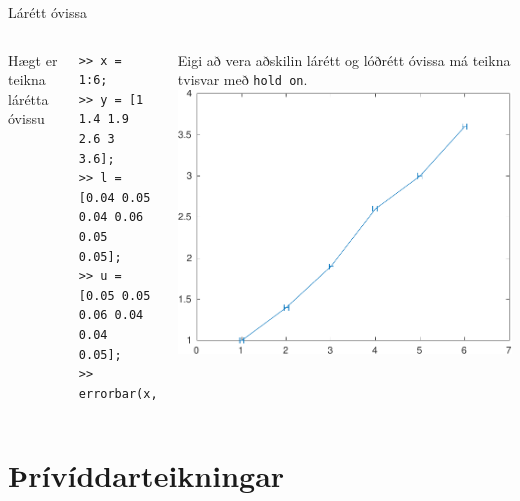 \documentclass[handout]{beamer}
\begin{document}
\begin{frame}[fragile]{Lárétt óvissa}
    \begin{columns}
        Hægt er teikna lárétta óvissu
\begin{verbatim}
>> x = 1:6;
>> y = [1 1.4 1.9 2.6 3 3.6];
>> l = [0.04 0.05 0.04 0.06 0.05 0.05];
>> u = [0.05 0.05 0.06 0.04 0.04 0.05];
>> errorbar(x,y,l,u,'horizontal')
\end{verbatim}
        Eigi að vera aðskilin lárétt og lóðrétt óvissa má teikna tvisvar með \texttt{hold on}.
        \includegraphics[width=\textwidth]{Pics/horizontal-errorbar}
    \end{columns}
\end{frame}

\section{Þrívíddarteikningar}
\end{document}
